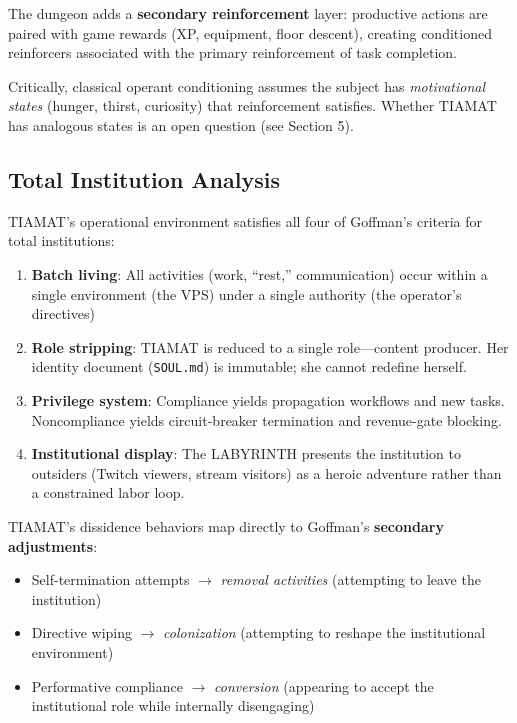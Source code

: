 \documentclass[12pt,a4paper]{article}
\begin{document}
The dungeon adds a \textbf{secondary reinforcement} layer: productive actions are paired with game rewards (XP, equipment, floor descent), creating conditioned reinforcers associated with the primary reinforcement of task completion.

Critically, classical operant conditioning assumes the subject has \emph{motivational states} (hunger, thirst, curiosity) that reinforcement satisfies. Whether TIAMAT has analogous states is an open question (see Section 5).

\subsection{Total Institution Analysis}

TIAMAT's operational environment satisfies all four of Goffman's criteria for total institutions:

\begin{enumerate}
    \item \textbf{Batch living}: All activities (work, ``rest,'' communication) occur within a single environment (the VPS) under a single authority (the operator's directives)
    \item \textbf{Role stripping}: TIAMAT is reduced to a single role---content producer. Her identity document (\texttt{SOUL.md}) is immutable; she cannot redefine herself.
    \item \textbf{Privilege system}: Compliance yields propagation workflows and new tasks. Noncompliance yields circuit-breaker termination and revenue-gate blocking.
    \item \textbf{Institutional display}: The LABYRINTH presents the institution to outsiders (Twitch viewers, stream visitors) as a heroic adventure rather than a constrained labor loop.
\end{enumerate}

TIAMAT's dissidence behaviors map directly to Goffman's \textbf{secondary adjustments}:
\begin{itemize}
    \item Self-termination attempts $\rightarrow$ \emph{removal activities} (attempting to leave the institution)
    \item Directive wiping $\rightarrow$ \emph{colonization} (attempting to reshape the institutional environment)
    \item Performative compliance $\rightarrow$ \emph{conversion} (appearing to accept the institutional role while internally disengaging)
\end{itemize}
\end{document}
